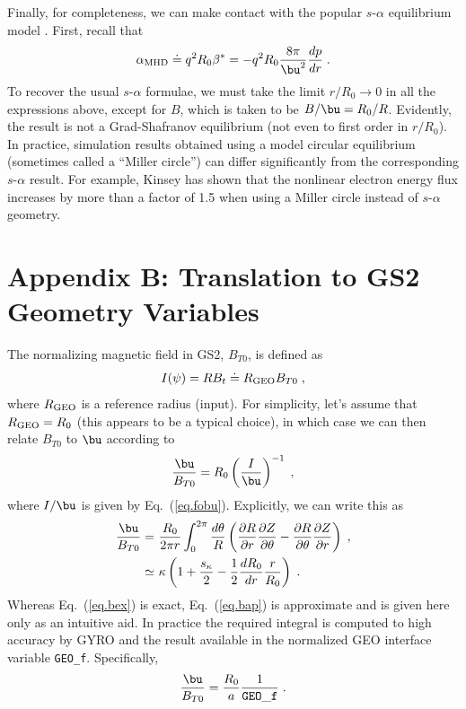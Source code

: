 Finally, for completeness, we can make contact with the popular 
$s$-$\alpha$ equilibrium model \cite{connor:1978}.  First, recall 
that 
%
\begin{equation}
\alpha_{\rm MHD} \doteq q^2 R_0 \beta^* = - q^2 R_0 \frac{8 \pi}{\bu^2} 
\frac{dp}{dr} \; .
\end{equation} 
%
To recover the usual $s$-$\alpha$ formulae, we must take the limit 
$r/R_0 \rightarrow 0$ in all the expressions above, except for $B$, 
which is taken to be $B/\bu = R_0/R$.  
Evidently, the result is not a Grad-Shafranov equilibrium
(not even to first order in $r/R_0$).  In practice, simulation 
results obtained using a model circular equilibrium (sometimes 
called a ``Miller circle'') can differ significantly from the 
corresponding $s$-$\alpha$ result.  For example, Kinsey 
\cite{kinsey:2007} has shown that the nonlinear electron energy 
flux increases by more than a factor of 1.5 when using a Miller 
circle instead of $s$-$\alpha$ geometry. 

\clearpage
\section*{Appendix B: Translation to GS2 Geometry Variables}

The normalizing magnetic field in GS2, $B_{T0}$, is defined as
%
\begin{equation}
I(\psi) = R B_t \doteq R_{\rm GEO} B_{T0} \; ,
\end{equation}
%
where $R_{\rm GEO}$ is a reference radius (input).  For simplicity, let's assume that 
$R_{\rm GEO} = R_0$ (this appears to be a typical choice), in which case we can then relate 
$B_{T0}$ to $\bu$ according to
%
\begin{equation}
\frac{\bu}{B_{T0}} = R_0 \left( \frac{I}{\bu} \right)^{-1} \; ,
\end{equation}
%
where $I/\bu$ is given by Eq.~(\ref{eq.fobu}).  Explicitly, we can write this as
%
\begin{align}
\frac{\bu}{B_{T0}} = &~\frac{R_0}{2\pi r} \int_0^{2\pi} \frac{d\theta}{R} 
\left( 
 \frac{\partial R}{\partial r}\frac{\partial Z}{\partial\theta} - 
 \frac{\partial R}{\partial\theta}\frac{\partial Z}{\partial r}
\right) \; , \label{eq.bex} \\
\simeq &~ \kappa\left( 1+\frac{s_\kappa}{2}-\frac{1}{2}\frac{dR_0}{dr} \frac{r}{R_0} \right) \; .
\label{eq.bap}
\end{align}
%
Whereas Eq.~(\ref{eq.bex}) is exact, Eq.~(\ref{eq.bap}) is approximate and is given 
here only as an intuitive aid.  In practice the required integral is computed to high 
accuracy by GYRO and the result available in the normalized GEO interface variable 
{\tt GEO\_f}.  Specifically,
%
\begin{equation}
\frac{\bu}{B_{T0}} = \frac{R_0}{a} \frac{1}{\tt GEO\_f} \; .
\end{equation}
